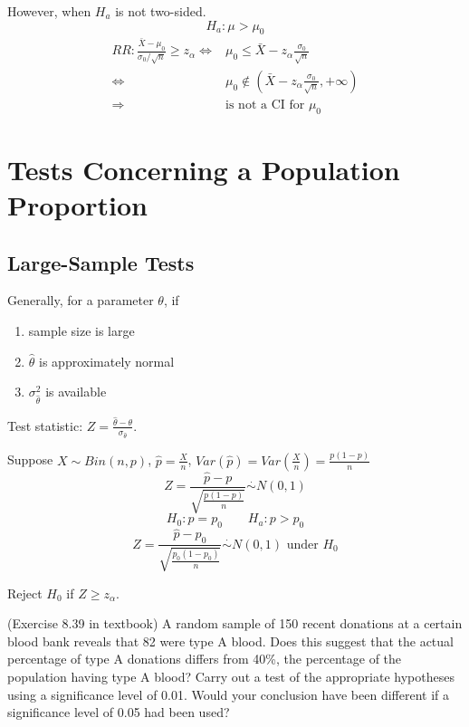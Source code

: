 However, when $H_a$ is not two-sided.
\[ H_a:\mu>\mu_0\]
\begin{align*}
RR: \frac{\bar{X}-\mu_0}{\sigma_0/\sqrt{n}}\geq z_{\alpha} \Leftrightarrow &  \mu_0\leq \bar{X}- z_{\alpha} \frac{\sigma_0}{\sqrt{n}} \\
\Leftrightarrow &  \mu_0 \notin \left(\bar{X}- z_{\alpha} \frac{\sigma_0}{\sqrt{n}},+\infty \right) \\
\Rightarrow & \text{is not a CI for }\mu_0 
\end{align*}

\section{Tests Concerning a Population Proportion}
\subsection{Large-Sample Tests}

Generally, for a parameter $\theta$, if
\begin{enumerate}
\item sample size is large
\item $\hat{\theta}$ is approximately normal
\item $\sigma_{\hat{\theta}}^2$ is available
\end{enumerate}

Test statistic: $Z=\frac{\hat{\theta}-\theta}{\sigma_{\hat{\theta}}}$.

Suppose $X\sim Bin(n,p)$, $\hat{p}=\frac{X}{n}$, $Var(\hat{p})=Var\left(\frac{X}{n}\right)=\frac{p(1-p)}{n}$
\[Z=\frac{\hat{p}-p}{\sqrt{\frac{p(1-p)}{n}}} \overset{\cdot}{\sim}N(0,1)\]
\[H_0:p=p_0 \qquad H_a:p>p_0\]
\[Z=\frac{\hat{p}-p_0}{\sqrt{\frac{p_0(1-p_0)}{n}}} \overset{\cdot}{\sim}N(0,1) \text{ under }H_0\]

Reject $H_0$ if $Z\geq z_{\alpha}$.

\begin{exmp}
(Exercise 8.39 in textbook)
A random sample of 150 recent donations at a certain blood bank reveals that 82 were type A blood. Does this suggest that the actual percentage of type A donations differs from 40\%, the percentage of the population having type A blood? Carry out a test of the appropriate hypotheses using a significance level of 0.01. Would your conclusion have been different if a significance level of 0.05 had been used?
\end{exmp}

